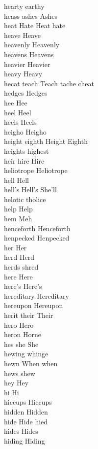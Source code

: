 hearty earthy\\
heass ashes Ashes\\
heat Hate Heat hate\\
heave Heave\\
heavenly Heavenly\\
heavens Heavens\\
heavier Heavier\\
heavy Heavy\\
hecat teach Teach tache cheat\\
hedges Hedges\\
hee Hee\\
heel Heel\\
heels Heels\\
heigho Heigho\\
height eighth Height Eighth\\
heights highest\\
heir hire Hire\\
heliotrope Heliotrope\\
hell Hell\\
hell's Hell's She'll\\
helotic tholice\\
help Help\\
hem Meh\\
henceforth Henceforth\\
henpecked Henpecked\\
her Her\\
herd Herd\\
herds shred\\
here Here\\
here's Here's\\
hereditary Hereditary\\
hereupon Hereupon\\
herit their Their\\
hero Hero\\
heron Horne\\
hes she She\\
hewing whinge\\
hewn When when\\
hews shew\\
hey Hey\\
hi Hi\\
hiccups Hiccups\\
hidden Hidden\\
hide Hide hied\\
hides Hides\\
hiding Hiding\\

